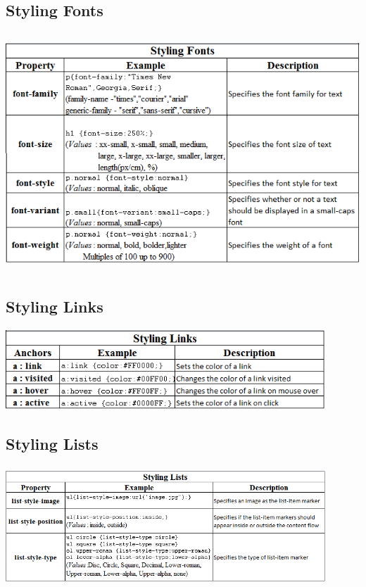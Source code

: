 \documentclass[11pt,a4paper]{article}
\begin{document}
\subsection*{Styling Fonts}
\begin{center}
\includegraphics[width = 155mm,  height = 90mm]{Fonts.png}
\end{center}
\subsection*{Styling Links}
\begin{center}
\includegraphics[width = 120mm,  height = 30mm]{Lists.png}\\
\end{center}
\subsection*{Styling Lists}
\begin{center}
\includegraphics[width = 120mm, height = 45mm]{Links.png}\\
\end{center}
\end{document}
